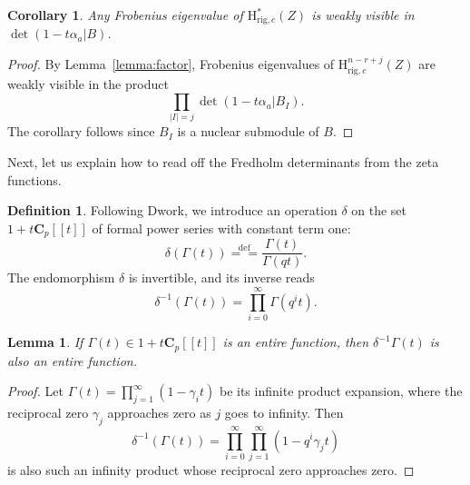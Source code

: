 \documentclass{amsart}
\numberwithin{equation}{section}
\theoremstyle{plain}
\newtheorem{lemma}[equation]{Lemma}
\newtheorem{corollary}[equation]{Corollary}
\theoremstyle{definition}
\newtheorem{definition}[equation]{Definition}
\renewcommand{\mathbb}{\mathbf}
\begin{document}
\begin{corollary}%
\label{corollary:visibility}
Any Frobenius eigenvalue of \(\mathrm{H}^{\ast}_{\mathrm{rig},c}(Z)\) is weakly
visible in \(\det(1-t\alpha_{a}|B)\).
\end{corollary}

\begin{proof}
By Lemma~\ref{lemma:factor}, Frobenius eigenvalues of
\(\mathrm{H}^{n-r+j}_{\mathrm{rig},c}(Z)\) are weakly visible in the
product
\[\prod\limits_{|I|=j}\det(1-t\alpha_{a}|B_{I}).\]
The corollary follows since \(B_{I}\) is a nuclear submodule of \(B\).
\end{proof}

Next, let us explain how to read off the Fredholm determinants from the zeta
functions.

\begin{definition}\label{definition:delta-operator}%
  Following Dwork, we introduce an operation
  \(\delta\) on the set \(1 + t \mathbb{C}_{p}[\![t]\!]\)
  of formal power series with constant term one:
  \begin{equation*}
    \delta(\Gamma(t)) \overset{\mathrm{def}}{=\!=} \frac{\Gamma(t)}{\Gamma(qt)}.
  \end{equation*}
  The endomorphism \(\delta\) is invertible, and its inverse reads
  \begin{equation*}
    \delta^{-1}(\Gamma(t)) = \prod_{i=0}^{\infty} \Gamma(q^{i}t).
  \end{equation*}
\end{definition}

\begin{lemma}\label{lemma:entireness}
  If \(\Gamma(t) \in 1 + t \mathbb{C}_p[\![t]\!]\) is an entire function,
  then \(\delta^{-1}\Gamma(t)\) is also an entire function.
\end{lemma}

\begin{proof}
Let \(\Gamma(t) = \prod_{j=1}^{\infty}(1-\gamma_{i}t)\) be its infinite
product expansion, where the reciprocal zero $\gamma_j$ approaches zero as $j$ goes to infinity.
Then
\[\delta^{-1}(\Gamma(t)) = \prod_{i=0}^{\infty} \prod_{j=1}^{\infty} (1-q^i\gamma_jt)\]
is also such an infinity product whose reciprocal zero approaches zero.
\end{proof}
\end{document}
